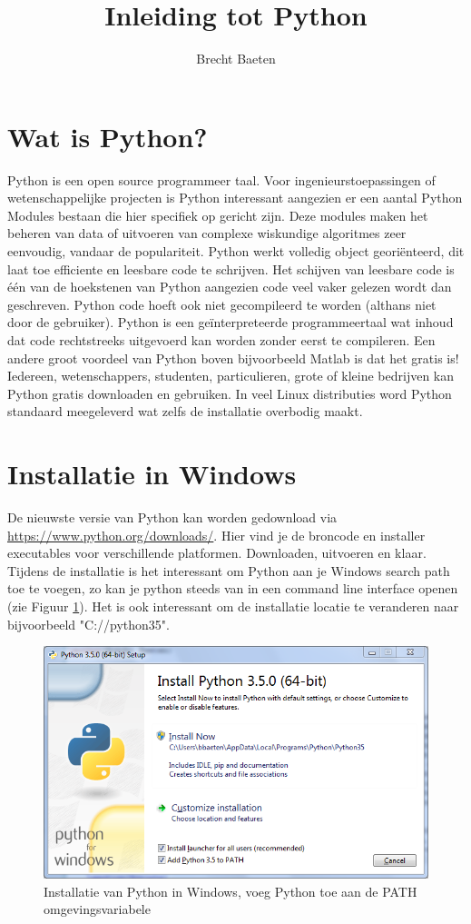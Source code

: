 \documentclass[11pt,twoside]{article}
\title{Inleiding tot Python}
\author{Brecht Baeten}
\begin{document}
	\maketitle

	\section{Wat is Python?}
Python is een open source programmeer taal. Voor ingenieurstoepassingen of wetenschappelijke projecten is Python interessant aangezien er een aantal Python Modules bestaan die hier specifiek op gericht zijn. Deze modules maken het beheren van data of uitvoeren van complexe wiskundige algoritmes zeer eenvoudig, vandaar de populariteit. Python werkt volledig object georiënteerd, dit laat toe efficiente en leesbare code te schrijven. Het schijven van leesbare code is één van de hoekstenen van Python aangezien code veel vaker gelezen wordt dan geschreven. Python code hoeft ook niet gecompileerd te worden (althans niet door de gebruiker). Python is een geïnterpreteerde programmeertaal wat inhoud dat code rechtstreeks uitgevoerd kan worden zonder eerst te compileren. Een andere groot voordeel van Python boven bijvoorbeeld Matlab is dat het gratis is! Iedereen, wetenschappers, studenten, particulieren, grote of kleine bedrijven kan Python gratis downloaden en gebruiken. In veel Linux distributies word Python standaard meegeleverd wat zelfs de installatie overbodig maakt.

	\section{Installatie in Windows}
De nieuwste versie van Python kan worden gedownload via \url{https://www.python.org/downloads/}. Hier vind je de broncode en installer executables voor verschillende platformen. Downloaden, uitvoeren en klaar. Tijdens de installatie is het interessant om Python aan je Windows search path toe te voegen, zo kan je python steeds van in een command line interface openen (zie Figuur \ref{Python_350_(64-bit)_Setup}). Het is ook interessant om de installatie locatie te veranderen naar bijvoorbeeld  "\textsf{C://python35}".
\begin{figure}[htp]
	\centering
	\includegraphics[scale=0.5]{Python_350_(64-bit)_Setup}
	\caption{Installatie van Python in Windows, voeg Python toe aan de PATH omgevingsvariabele}
	\label{Python_350_(64-bit)_Setup}
\end{figure}
\end{document}
